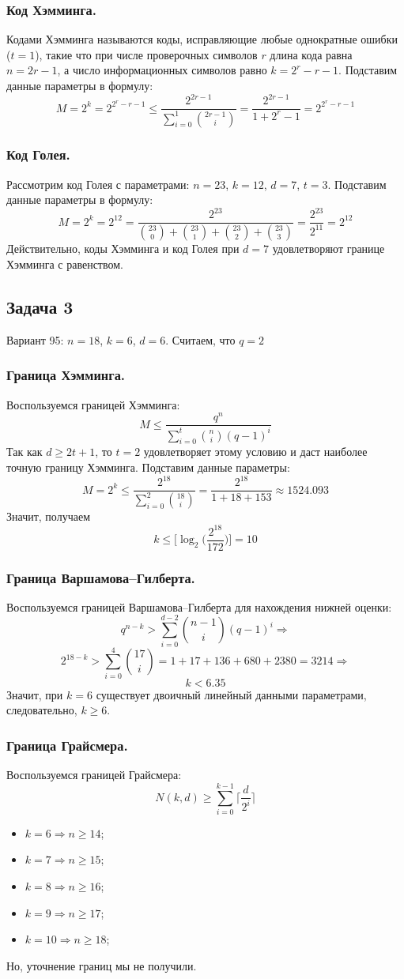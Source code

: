 \documentclass{article}
\begin{document}
\subsubsection{Код Хэмминга.}
Кодами Хэмминга называются коды, исправляющие любые однократные ошибки ($t=1$), такие что при числе проверочных символов $r$ длина кода равна $n = 2r - 1$, а число информационных символов равно $k = 2^{r} - r -1$. Подставим данные параметры в формулу:
%
$$M = 2^{k} = 2^{2^{r} - r - 1} \leq \frac{2^{2r - 1}}{\sum^{1}_{i=0}\binom{2r - 1}{i}} = \frac{2^{2r - 1}}{1 + 2^{r} - 1} = 2^{2^{r} - r - 1}$$
%
\subsubsection{Код Голея.}
%
Рассмотрим код Голея с параметрами: $n = 23$, $k = 12$, $d = 7$, $t = 3$. Подставим данные параметры в формулу:
%
$$M = 2^{k} = 2^{12} = \frac{2^{23}}{\binom{23}{0} + \binom{23}{1} + \binom{23}{2} + \binom{23}{3}} = \frac{2^{23}}{2^{11}} = 2^{12}$$
%
Действительно, коды Хэмминга и код Голея при $d = 7$ удовлетворяют границе Хэмминга с равенством.
%
\subsection{Задача 3}
Вариант 95: $n=18$, $k=6$, $d=6$. Считаем, что $q=2$
%
\subsubsection{Граница Хэмминга.}
Воспользуемся границей Хэмминга:
$$M \leq \frac{q^{n}}{\sum^{t}_{i=0}\binom{n}{i}(q-1)^{i}}$$
Так как $d \geq 2t + 1$, то $t=2$ удовлетворяет этому условию и даст наиболее точную границу Хэмминга. Подставим данные параметры:
$$M = 2^{k} \leq \frac{2^{18}}{\sum^{2}_{i=0}\binom{18}{i}} = \frac{2^{18}}{1 + 18 + 153} \approx 1524.093$$
Значит, получаем $$k \leq \Big[\log_{2}\Big(\frac{2^{18}}{172}\Big)\Big] = 10$$
%
\subsubsection{Граница Варшамова–Гилберта.}
%
Воспользуемся границей Варшамова–Гилберта для нахождения нижней оценки:
$$q^{n-k} > \sum_{i=0}^{d-2}\binom{n - 1}{i} (q - 1)^{i} \Rightarrow$$
$$2^{18-k} > \sum_{i=0}^{4}\binom{17}{i} = 1 + 17 + 136 + 680 + 2380 = 3214 \Rightarrow$$
$$k < 6.35$$
Значит, при $k=6$ существует двоичный линейный данными параметрами, следовательно, $k \geq 6$.
%
\subsubsection{Граница Грайсмера.}
%
Воспользуемся границей Грайсмера:
$$N(k,d) \geq \sum_{i=0}^{k-1} \Big\lceil \frac{d}{2^{i}} \Big\rceil$$
\begin{itemize}
    \item $k = 6 \Rightarrow n \geq 14$;
    \item $k = 7 \Rightarrow n \geq 15$;
    \item $k = 8 \Rightarrow n \geq 16$;
    \item $k = 9 \Rightarrow n \geq 17$;
    \item $k = 10 \Rightarrow n \geq 18$;
\end{itemize}
Но, уточнение границ мы не получили.
%
\end{document}
